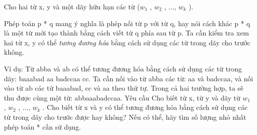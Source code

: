 Cho hai từ x, y và một dãy hữu hạn các từ ($w_{1}$   , $w_{2}$   , ..., $w_{k}$   ).  



   Phép toán p * q mang ý nghĩa là phép nối từ p với từ q, hay nói cách khác p * q là một từ mới tạo thành bằng cách viết từ q phía sau từ p.   Ta cần kiểm tra xem hai từ x, y có thể   \textit{    tương đương hóa   }   bằng cách sử dụng các từ trong dãy cho trước không.  

   Ví dụ: Từ abba và ab có thể tương đương hóa bằng cách sử dụng các từ trong dãy: baaabad aa badccaa cc. Ta cần nối vào từ abba các   từ: aa và badccaa, và nối vào từ ab các từ baaabad, cc và aa theo thứ tự. Trong cả hai trường hợp, ta sẽ thu được cùng một từ:   abbaaabadccaa.
   Yêu cầu  
Cho biết từ x, từ y và dãy từ $w_{1}$   , $w_{2}$   , ..., $w_{k}$   . Cho biết từ x và y có thể tương đương hóa bằng cách   sử dụng các từ trong dãy cho trước được hay không? Nếu có thể, hãy tìm số lượng nhỏ nhất phép toán * cần sử dụng.